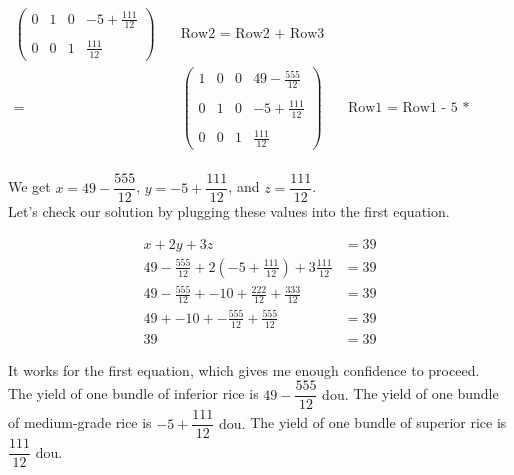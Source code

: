 \documentclass{article}
\begin{document}
\begin{align*}
\begin{pmatrix}
0 & 1 & 0 & -5 + \frac{111}{12} \\ \\
0 & 0 & 1 & \frac{111}{12}
\end{pmatrix} \quad &\text{Row2 = Row2 + Row3} \\
= & \begin{pmatrix}
1 & 0 & 0 & 49 - \frac{555}{12} \\ \\
0 & 1 & 0 & -5 + \frac{111}{12} \\ \\
0 & 0 & 1 & \frac{111}{12}
\end{pmatrix} \quad &\text{Row1 = Row1 - 5 * Row3} \\
\end{align*}

We get $x = 49 - \dfrac{555}{12}$, $y = -5 + \dfrac{111}{12}$, and $z = \dfrac{111}{12}$. \\

Let's check our solution by plugging these values into the first equation.

\begin{align*}
x + 2y + 3z &= 39 \\
49 - \frac{555}{12} + 2(-5 + \frac{111}{12}) + 3 \frac{111}{12} &= 39 \\
49 - \frac{555}{12} + -10 + \frac{222}{12} + \frac{333}{12} &= 39 \\
49 + -10 + -\frac{555}{12} + \frac{555}{12} &= 39 \\
39 &= 39
\end{align*}

It works for the first equation, which gives me enough confidence to proceed. \\

The yield of one bundle of inferior rice is $\boxed{49 - \dfrac{555}{12} \text{ dou}.}$ The yield of one bundle of medium-grade rice is $\boxed{-5 + \dfrac{111}{12} \text{ dou}.}$ The yield of one bundle of superior rice is $\boxed{\dfrac{111}{12} \text{ dou}.}$
\end{document}
